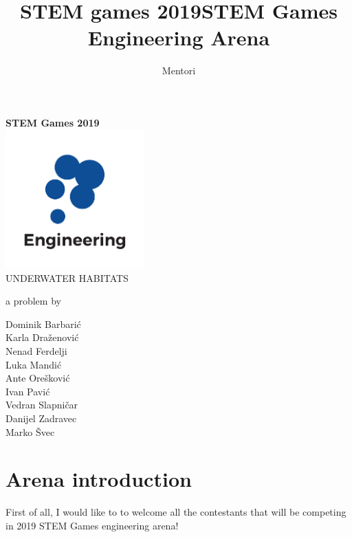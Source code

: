\documentclass[openany]{book}
\title{STEM games 2019}
\author{Mentori}
\title{STEM Games Engineering Arena}
\date{}
\begin{document}
	
	\thispagestyle{empty}
	\newpage
	\thispagestyle{empty}
	\vspace*{0cm}
	\begin{center}
		
		\textbf{\Huge{STEM Games 2019}}\\
		\vspace*{2.4cm}
		\includegraphics[width=0.4\textwidth]{logos/engineering} \\
		\vspace*{2.4cm}
		\huge{UNDERWATER HABITATS}
		
		\medskip
		
		\normalsize{a problem by}
		
		\medskip
		
		Dominik Barbarić \\
		Karla Draženović \\
		Nenad Ferdelji \\
		Luka Mandić \\
		Ante Orešković \\
		Ivan Pavić \\
		Vedran Slapničar \\
		Danijel Zadravec \\
		Marko Švec 
		
		\vspace{6cm}
		
		
		\normalsize{}
	\end{center}

	\tableofcontents
	\newpage
	

	\chapter{Arena introduction}
	
	First of all, I would like to to welcome all the contestants that will be 
	competing in 
	2019 STEM Games engineering arena!
	
\end{document}
